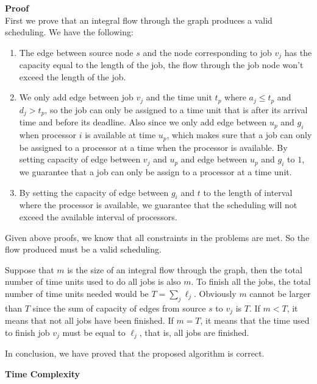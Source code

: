 \documentclass{article}
\newcommand{\Complexity}{\vspace{0.3cm} \noindent\textbf{Time Complexity} \\}
\newcommand{\Proof}{\vspace{0.3cm} \noindent\textbf{Proof} \\}
\begin{document}
\Proof
First we prove that an integral flow through the graph produces a valid scheduling. We have the
following:
\begin{enumerate}
  \item The edge between source node $s$ and the node corresponding to job $v_j$ has the capacity equal
    to the length of the job, the flow through the job node won't exceed the length of the job. 
  \item We only add edge between job $v_j$ and the time unit $t_p$ where $a_j \leq t_p$ and $d_j > t_p$, so the
    job can only be assigned to a time unit that is after its arrival time and before its deadline.
    Also since we only add edge between $u_p$ and $g_i$ when processor $i$ is available at time $u_p$,
    which makes sure that a job can only be assigned to a processor at a time when the processor is
    available. By setting capacity of edge between $v_j$ and $u_p$ and edge between $u_p$ and $g_i$
    to $1$, we guarantee that a job can only be assign to a processor at a time unit. 
  \item By setting the capacity of edge between $g_i$ and $t$ to the length of interval where the
    processor is available, we guarantee that the scheduling will not exceed the available interval
    of processors.
\end{enumerate}
Given above proofs, we know that all constraints in the problems are met. So the flow produced
must be a valid scheduling.  

Suppose that $m$ is the size of an integral flow through the graph, then the total number of time
units used to do all jobs is also $m$. To finish all the jobs, the total number of time units needed
would be $T = \sum_{j}\ell_j$. Obviously $m$ cannot be larger than $T$ since the sum of capacity
of edges from source $s$ to $v_j$ is $T$. If $m < T$, it means that not all jobs have been finished.       
If $m = T$, it means that the time used to finish job $v_j$ must be equal to $\ell_j$, that is, all
jobs are finished.

In conclusion, we have proved that the proposed algorithm is correct.

\Complexity
\end{document}

